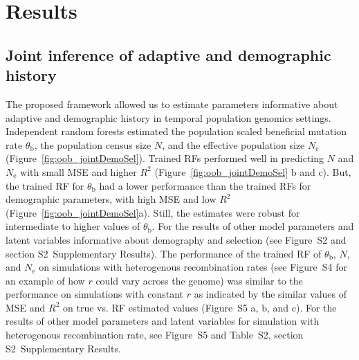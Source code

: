 \documentclass[a4paper, 12pt]{article}
\begin{document}
\section*{Results}

\subsection*{Joint inference of adaptive and demographic history}

The proposed framework allowed us to estimate parameters informative about adaptive and demographic history in temporal population genomics settings. Independent random forests estimated the population scaled beneficial mutation rate $\theta_\mathrm{b}$, the population census size $N$, and the effective population size $N_{\mathrm{e}}$ (Figure~\ref{fig:oob_jointDemoSel}). Trained RFs performed well in predicting $N$ and $N_{\mathrm{e}}$ with small MSE and higher $R^2$ (Figure~\ref{fig:oob_jointDemoSel} b and c). But, the trained RF for  $\theta_\mathrm{b}$ had a lower performance than the trained RFs for demographic parameters, with high MSE and low $R^2$ (Figure~\ref{fig:oob_jointDemoSel}a). Still, the estimates were robust for intermediate to higher values of $\theta_\mathrm{b}$. For the results of other model parameters and latent variables informative about demography and selection (see Figure~S2  and section S2~Supplementary Results). The performance of the trained RF of  $\theta_\mathrm{b}$, $N$, and $N_{\mathrm{e}}$ on simulations with heterogenous recombination rates (see Figure~S4 for an example of how $r$ could vary across the genome) was similar to the performance on simulations with constant $r$ as indicated by the similar values of MSE and $R^2$ on true vs. RF estimated values (Figure~S5 a, b, and c). For the results of other model parameters and latent variables for simulation with heterogenous recombination rate, see Figure~S5 and Table~S2, section S2~Supplementary Results.
\end{document}
